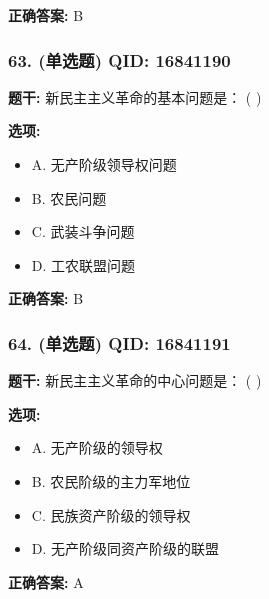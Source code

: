 \documentclass[12pt,UTF8]{ctexart}
\begin{document}
\textbf{正确答案:}
B

\vspace{0.3em}\hrulefill\vspace{0.7em}

\subsubsection*{63. (单选题) \small QID: 16841190}

\textbf{题干:}
新民主主义革命的基本问题是： ( )

\textbf{选项:}
\begin{itemize}[leftmargin=*]

  \item A. 无产阶级领导权问题

  \item B. 农民问题

  \item C. 武装斗争问题

  \item D. 工农联盟问题

\end{itemize}

\textbf{正确答案:}
B

\vspace{0.3em}\hrulefill\vspace{0.7em}

\subsubsection*{64. (单选题) \small QID: 16841191}

\textbf{题干:}
新民主主义革命的中心问题是： ( )

\textbf{选项:}
\begin{itemize}[leftmargin=*]

  \item A. 无产阶级的领导权

  \item B. 农民阶级的主力军地位

  \item C. 民族资产阶级的领导权

  \item D. 无产阶级同资产阶级的联盟

\end{itemize}

\textbf{正确答案:}
A

\vspace{0.3em}\hrulefill\vspace{0.7em}
\end{document}
